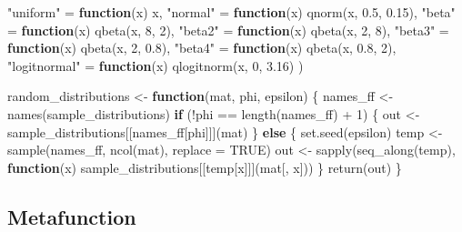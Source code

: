 \documentclass[
  11pt,
]{article}
\newenvironment{Shaded}{\begin{snugshade}}{\end{snugshade}}
\newcommand{\AttributeTok}[1]{\textcolor[rgb]{0.77,0.63,0.00}{#1}}
\newcommand{\ConstantTok}[1]{\textcolor[rgb]{0.00,0.00,0.00}{#1}}
\newcommand{\ControlFlowTok}[1]{\textcolor[rgb]{0.13,0.29,0.53}{\textbf{#1}}}
\newcommand{\DecValTok}[1]{\textcolor[rgb]{0.00,0.00,0.81}{#1}}
\newcommand{\FloatTok}[1]{\textcolor[rgb]{0.00,0.00,0.81}{#1}}
\newcommand{\FunctionTok}[1]{\textcolor[rgb]{0.00,0.00,0.00}{#1}}
\newcommand{\NormalTok}[1]{#1}
\newcommand{\OtherTok}[1]{\textcolor[rgb]{0.56,0.35,0.01}{#1}}
\newcommand{\SpecialCharTok}[1]{\textcolor[rgb]{0.00,0.00,0.00}{#1}}
\newcommand{\StringTok}[1]{\textcolor[rgb]{0.31,0.60,0.02}{#1}}
\begin{document}
\begin{Shaded}
\begin{Highlighting}[]
  \StringTok{"uniform"} \OtherTok{=} \ControlFlowTok{function}\NormalTok{(x) x,}
  \StringTok{"normal"} \OtherTok{=} \ControlFlowTok{function}\NormalTok{(x) }\FunctionTok{qnorm}\NormalTok{(x, }\FloatTok{0.5}\NormalTok{, }\FloatTok{0.15}\NormalTok{),}
  \StringTok{"beta"} \OtherTok{=} \ControlFlowTok{function}\NormalTok{(x) }\FunctionTok{qbeta}\NormalTok{(x, }\DecValTok{8}\NormalTok{, }\DecValTok{2}\NormalTok{),}
  \StringTok{"beta2"} \OtherTok{=} \ControlFlowTok{function}\NormalTok{(x) }\FunctionTok{qbeta}\NormalTok{(x, }\DecValTok{2}\NormalTok{, }\DecValTok{8}\NormalTok{),}
  \StringTok{"beta3"} \OtherTok{=} \ControlFlowTok{function}\NormalTok{(x) }\FunctionTok{qbeta}\NormalTok{(x, }\DecValTok{2}\NormalTok{, }\FloatTok{0.8}\NormalTok{),}
  \StringTok{"beta4"} \OtherTok{=} \ControlFlowTok{function}\NormalTok{(x) }\FunctionTok{qbeta}\NormalTok{(x, }\FloatTok{0.8}\NormalTok{, }\DecValTok{2}\NormalTok{),}
  \StringTok{"logitnormal"} \OtherTok{=} \ControlFlowTok{function}\NormalTok{(x) }\FunctionTok{qlogitnorm}\NormalTok{(x, }\DecValTok{0}\NormalTok{, }\FloatTok{3.16}\NormalTok{)}
\NormalTok{)}

\NormalTok{random\_distributions }\OtherTok{\textless{}{-}} \ControlFlowTok{function}\NormalTok{(mat, phi, epsilon) \{}
\NormalTok{  names\_ff }\OtherTok{\textless{}{-}} \FunctionTok{names}\NormalTok{(sample\_distributions)}
  \ControlFlowTok{if}\NormalTok{ (}\SpecialCharTok{!}\NormalTok{phi }\SpecialCharTok{==} \FunctionTok{length}\NormalTok{(names\_ff) }\SpecialCharTok{+} \DecValTok{1}\NormalTok{) \{}
\NormalTok{    out }\OtherTok{\textless{}{-}}\NormalTok{ sample\_distributions[[names\_ff[phi]]](mat)}
\NormalTok{  \} }\ControlFlowTok{else}\NormalTok{ \{}
    \FunctionTok{set.seed}\NormalTok{(epsilon)}
\NormalTok{    temp }\OtherTok{\textless{}{-}} \FunctionTok{sample}\NormalTok{(names\_ff, }\FunctionTok{ncol}\NormalTok{(mat), }\AttributeTok{replace =} \ConstantTok{TRUE}\NormalTok{)}
\NormalTok{    out }\OtherTok{\textless{}{-}} \FunctionTok{sapply}\NormalTok{(}\FunctionTok{seq\_along}\NormalTok{(temp), }\ControlFlowTok{function}\NormalTok{(x) sample\_distributions[[temp[x]]](mat[, x]))}
\NormalTok{  \}}
  \FunctionTok{return}\NormalTok{(out)}
\NormalTok{\}}
\end{Highlighting}
\end{Shaded}

\hypertarget{metafunction}{%
\subsection{Metafunction}\label{metafunction}}
\end{document}
